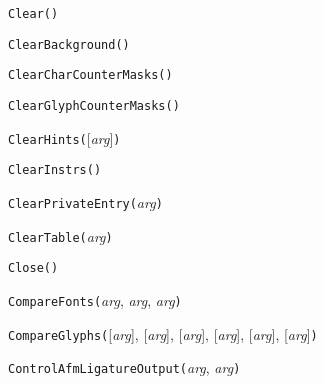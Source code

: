 \texttt{Clear()}



\texttt{ClearBackground(}\texttt{)}



\texttt{ClearCharCounterMasks(}\texttt{)}



\texttt{ClearGlyphCounterMasks(}\texttt{)}



\texttt{ClearHints(}[\textit{arg}]\texttt{)}



\texttt{ClearInstrs(}\texttt{)}



\texttt{ClearPrivateEntry(}\textit{arg}\texttt{)}



\texttt{ClearTable(}\textit{arg}\texttt{)}



\texttt{Close(}\texttt{)}



\texttt{CompareFonts(}\textit{arg}, \textit{arg}, \textit{arg}\texttt{)}



\texttt{CompareGlyphs(}[\textit{arg}], [\textit{arg}], [\textit{arg}], [\textit{arg}], [\textit{arg}], [\textit{arg}]\texttt{)}



\texttt{ControlAfmLigatureOutput(}\textit{arg}, \textit{arg}\texttt{)}

